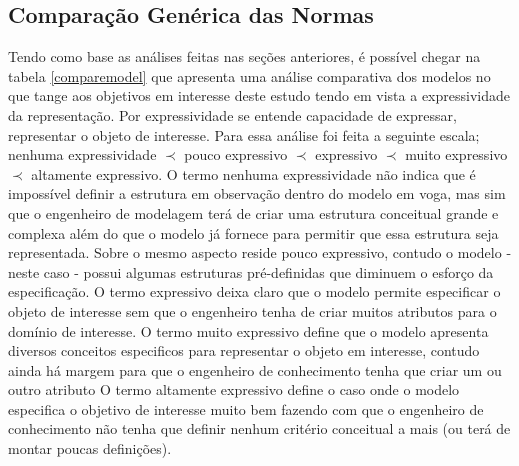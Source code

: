 \subsection{Comparação Genérica das Normas}

Tendo como base as análises feitas nas seções anteriores, é possível chegar na tabela \ref{comparemodel} que apresenta uma análise comparativa dos modelos no que tange aos objetivos em 
interesse deste estudo tendo em vista a expressividade da representação. Por expressividade se entende capacidade de expressar, representar o objeto de interesse. Para essa análise 
foi feita a seguinte escala; nenhuma expressividade $\prec$ pouco expressivo $\prec$ expressivo $\prec$ muito expressivo $\prec$ altamente expressivo. O termo nenhuma expressividade 
não indica que é impossível definir a estrutura em observação dentro do modelo em voga, mas sim que o engenheiro de modelagem terá de criar uma estrutura conceitual grande e complexa 
além do que o modelo já fornece para permitir que essa estrutura seja representada. Sobre o mesmo aspecto reside pouco expressivo, contudo o modelo - neste caso - possui algumas 
estruturas pré-definidas que diminuem o esforço da especificação. O termo expressivo deixa claro que o modelo permite especificar o objeto de interesse sem que o engenheiro 
tenha de criar muitos atributos para o domínio de interesse. O termo muito expressivo define que o modelo apresenta diversos conceitos especificos para representar o objeto em interesse, 
contudo ainda há margem para que o engenheiro de conhecimento tenha que criar um ou outro atributo O termo altamente expressivo define o caso onde o modelo especifica o objetivo 
de interesse muito bem fazendo com que o engenheiro de conhecimento não tenha que definir nenhum critério conceitual a mais (ou terá de montar poucas definições).   

